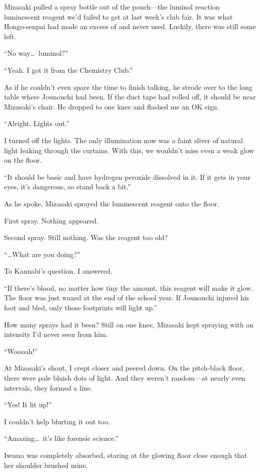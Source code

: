 \documentclass[
    a4paper,
    12pt,
    twoside,
    openany,
    UTF8,
    fontset=windows
]{ctexbook}
\begin{document}
Mizasaki pulled a spray bottle out of the pouch---the luminol reaction luminescent reagent we'd failed to get at last week's club fair. It was what Hongo-senpai had made an excess of and never used. Luckily, there was still some left.

``No way\dots\ luminol?''

``Yeah. I got it from the Chemistry Club.''

As if he couldn't even spare the time to finish talking, he strode over to the long table where Jounouchi had been. If the duct tape had rolled off, it should be near Mizasaki's chair. He dropped to one knee and flashed me an OK sign.

``Alright. Lights out.''

I turned off the lights. The only illumination now was a faint sliver of natural light leaking through the curtains. With this, we wouldn't miss even a weak glow on the floor.

``It should be basic and have hydrogen peroxide dissolved in it. If it gets in your eyes, it's dangerous, so stand back a bit.''

As he spoke, Mizasaki sprayed the luminescent reagent onto the floor.

First spray. Nothing appeared.

Second spray. Still nothing. Was the reagent too old?

``\dots What are you doing?''

To Kannabi's question, I answered.

``If there's blood, no matter how tiny the amount, this reagent will make it glow. The floor was just waxed at the end of the school year. If Jounouchi injured his foot and bled, only those footprints will light up.''

How many sprays had it been? Still on one knee, Mizasaki kept spraying with an intensity I'd never seen from him.

``Woooah!''

At Mizasaki's shout, I crept closer and peered down. On the pitch-black floor, there were pale bluish dots of light. And they weren't random---at nearly even intervals, they formed a line.

``Yes! It lit up!''

I couldn't help blurting it out too.

``Amazing\dots\ it's like forensic science.''

Iwama was completely absorbed, staring at the glowing floor close enough that her shoulder brushed mine.
\end{document}

